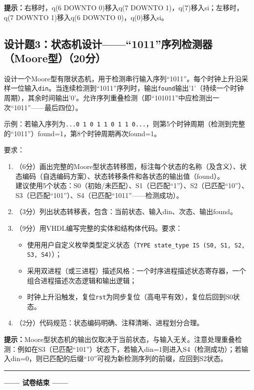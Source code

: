 \begin{framed}
\textbf{提示：}右移时，q(6 DOWNTO 0)移入q(7 DOWNTO 1)，q(7)移入si；左移时，q(7 DOWNTO 1)移入q(6 DOWNTO 0)，q(0)移入si。
\end{framed}

\subsection*{设计题3：状态机设计——``1011''序列检测器（Moore型）（20分）}

设计一个Moore型有限状态机，用于检测串行输入序列``1011''。每个时钟上升沿采样一位输入\verb|din|。当连续检测到``1011''序列时，输出\verb|found|输出'1'（持续一个时钟周期），其余时间输出'0'。允许序列重叠检测（即``101011''中应检测出一次``1011''——最后四位）。

示例：若输入序列为\verb|...0 1 0 1 1 0 1 1 0...|，则第5个时钟周期（检测到完整的``1011''）found=1，第8个时钟周期再次found=1。

要求：
\begin{enumerate}[label=(\arabic*)]
  \item （6分）画出完整的Moore型状态转移图，标注每个状态的名称（及含义）、状态编码（自选编码方案）、状态转移条件和各状态的输出值（found）。\\
  建议使用5个状态：S0（初始/未匹配）、S1（已匹配``1''）、S2（已匹配``10''）、S3（已匹配``101''）、S4（已匹配``1011''——检测成功）。
  \item （3分）列出状态转移表，包含：当前状态、输入din、次态、输出found。
  \item （9分）用VHDL编写完整的实体和结构体代码。要求：
  \begin{itemize}
    \item 使用用户自定义枚举类型定义状态（\verb|TYPE state_type IS (S0, S1, S2, S3, S4)|）；
    \item 采用双进程（或三进程）描述风格：一个时序进程描述状态寄存器，一个组合进程描述次态逻辑和输出逻辑；
    \item 时钟上升沿触发，复位\verb|rst|为同步复位（高电平有效），复位后回到S0状态。
  \end{itemize}
  \item （2分）代码规范：状态编码明确、注释清晰、进程划分合理。
\end{enumerate}

\begin{framed}
\textbf{提示：}Moore型状态机的输出仅取决于当前状态，与输入无关。注意处理重叠检测：例如在S3（已匹配``101''）状态下，若输入din=1则进入S4（检测成功）；若输入din=0，则已匹配的后缀``10''可视为新检测序列的前缀，应回到S2状态。
\end{framed}

\vspace{0.5cm}
{\centering
\rule{0.8\textwidth}{0.5pt}
\vspace{0.3cm}

\textbf{—— 试卷结束 ——}

\vspace{0.5cm}}

\endinput
